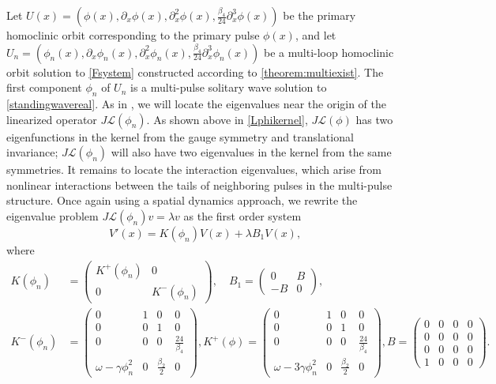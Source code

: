 \documentclass[12pt]{elsarticle}
\def\calL{{\mathcal L}}
\begin{document}
Let $U(x) = (\phi(x), \partial_x \phi(x), \partial_x^2 \phi(x), \frac{\beta_4}{24} \partial_x^3 \phi(x))$ be the primary homoclinic orbit corresponding to the primary pulse $\phi(x)$, and let $U_n = (\phi_n(x), \partial_x \phi_n(x), \partial_x^2 \phi_n(x), \frac{\beta_4}{24} \partial_x^3 \phi_n(x))$ be a multi-loop homoclinic orbit solution to \cref{Fsystem} constructed according to \cref{theorem:multiexist}. The first component $\phi_n$ of $U_n$ is a multi-pulse solitary wave solution to \cref{standingwavereal}. As in \cite{Sandstede1998,Manukian}, we will locate the eigenvalues near the origin of the linearized operator $J \calL(\phi_n)$. As shown above in \cref{Lphikernel}, $J \calL(\phi)$ has two eigenfunctions in the kernel from the gauge symmetry and translational invariance; $J \calL(\phi_n)$ will also have two eigenvalues in the kernel from the same symmetries. It remains to locate the interaction eigenvalues, which arise from nonlinear interactions between the tails of neighboring pulses in the multi-pulse structure. Once again using a spatial dynamics approach, we rewrite the eigenvalue problem $J \calL(\phi_n)v = \lambda v$ as the first order system
\begin{equation}\label{multieig}
V'(x) = K(\phi_n)V(x) + \lambda B_1 V(x),
\end{equation}
where
\begin{align*}
K(\phi_n) &= 
\begin{pmatrix}K^+(\phi_n) & 0 \\ 0 & K^-(\phi_n) \end{pmatrix}, \quad
B_1 = \begin{pmatrix}0 & B \\ -B & 0\end{pmatrix}, \\
K^-(\phi_n) &= \begin{pmatrix}
0 & 1 & 0 & 0 \\
0 & 0 & 1 & 0 \\
0 & 0 & 0 & \frac{24}{\beta_4} \\
\omega - \gamma \phi_n^2 & 0 & \frac{\beta_2}{2} & 0
\end{pmatrix},
K^+(\phi) = \begin{pmatrix}
0 & 1 & 0 & 0 \\
0 & 0 & 1 & 0 \\
0 & 0 & 0 & \frac{24}{\beta_4} \\
\omega - 3 \gamma \phi_n^2 & 0 & \frac{\beta_2}{2} & 0
\end{pmatrix},
B = \begin{pmatrix}
0 & 0 & 0 & 0 \\
0 & 0 & 0 & 0 \\
0 & 0 & 0 & 0 \\
1 & 0 & 0 & 0
\end{pmatrix}.
\end{align*}
\end{document}
